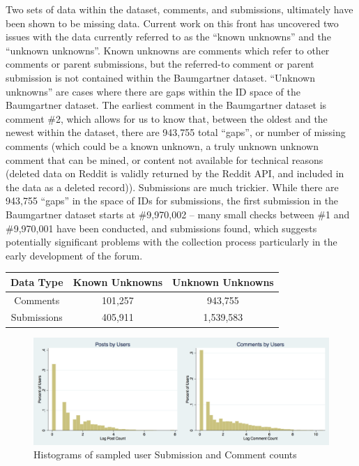 \documentclass[letterpaper,12pt]{article}
\begin{document}
Two sets of data within the dataset, comments, and submissions, ultimately have been shown to be missing data. Current work on this front has uncovered two issues with the data currently referred to as the ``known unknowns'' and the ``unknown unknowns''. Known unknowns are comments which refer to other comments or parent submissions, but the referred-to comment or parent submission is not contained within the Baumgartner dataset. ``Unknown unknowns'' are cases where there are gaps within the ID space of the Baumgartner dataset. The earliest comment in the  Baumgartner dataset is comment \#2, which allows for us to know that, between the oldest and the newest within the dataset, there are 943,755 total ``gaps'', or number of missing comments (which could be a known unknown, a truly unknown unknown comment that can be mined, or content not available for technical reasons (deleted data on Reddit is validly returned by the Reddit API, and included in the data as a deleted record)). Submissions are much trickier. While there are 943,755 ``gaps'' in the space of IDs for submissions, the first submission in the Baumgartner dataset starts at \#9,970,002 -- many small checks between \#1 and \#9,970,001 have been conducted, and submissions found, which suggests potentially significant problems with the collection process particularly in the early development of the forum. 
\begin{table}
  \begin{center}
    \begin{tabular}{ |c|c|c| } 
      \hline
      Data Type & Known Unknowns & Unknown Unknowns \\
      \hline
      Comments & 101,257 & 943,755 \\ 
      Submissions & 405,911 & 1,539,583 \\ 
      \hline
    \end{tabular}
  \end{center}
  \label{table:total_missing}
\end{table}

\begin{figure}[h]
  \centering
  \includegraphics[width=\textwidth]{post_counts}
  \caption{Histograms of sampled user Submission and Comment counts}
  \label{fig:post_counts}
\end{figure}
\end{document}

